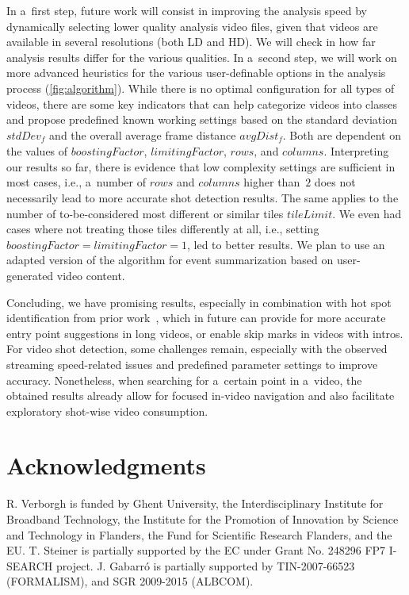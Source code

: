 \documentclass{sig-alternate}
\begin{document}
In a~first step, future work will consist in improving the analysis speed by dynamically selecting lower quality analysis video files, given that videos are available in several resolutions (both LD and HD). We will check in how far analysis results differ for the various qualities. In a~second step, we will work on more advanced heuristics for the various user-definable options in the analysis process (\autoref{fig:algorithm}). While there is no optimal configuration for all types of videos, there are some key indicators that can help categorize videos into classes and propose predefined known working settings based on the standard deviation $\mathit{stdDev_{f}}$ and the overall average frame distance $\mathit{avgDist_{f}}$. Both are dependent on the values of $\mathit{boostingFactor}$, $\mathit{limitingFactor}$, $\mathit{rows}$, and $\mathit{columns}$. Interpreting our results so far, there is evidence that low complexity settings are sufficient in most cases, i.e., a~number of $\mathit{rows}$ and $\mathit{columns}$ higher than~$\mathit{2}$ does not necessarily lead to more accurate shot detection results. The same applies to the number of to-be-considered most different or similar tiles $\mathit{tileLimit}$. We even had cases where not treating those tiles differently at all, i.e., setting $\mathit{boostingFactor} = \mathit{limitingFactor} = \mathit{1}$, led to better results. We plan to use an adapted version of the algorithm for event summarization based on user-generated video content.

Concluding, we have promising results, especially in combination with hot spot identification from prior work~\cite{derive2011}, which in future can provide for more accurate entry point suggestions in long videos, or enable skip marks in videos with intros.
For video shot detection, some challenges remain, especially with the observed streaming speed-related issues and predefined parameter settings to improve accuracy. None\-theless, when searching for a~certain point in a~video, the obtained results already allow for focused in-video navigation and also facilitate exploratory shot-wise video consumption.

\section{Acknowledgments} 
R. Verborgh is funded by Ghent University, the Interdisciplinary Institute for Broadband Technology, the Institute for the Promotion of Innovation by Science and Technology in Flanders, the Fund for Scientific Research Flanders, and the EU.
T. Steiner is partially supported by the EC under Grant No. 248296 FP7 \mbox{I-SEARCH} project.
J. Gabarr\'o is partially supported by TIN-2007-66523 (FORMALISM), and SGR 2009-2015 (ALBCOM).




\balancecolumns
\end{document}

